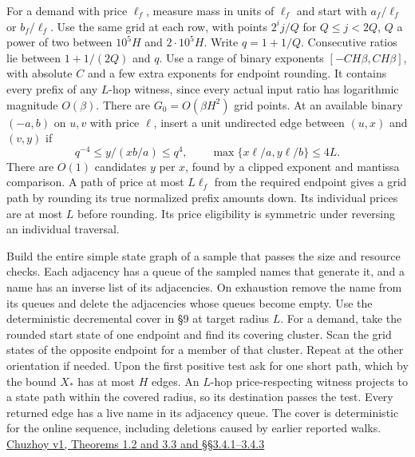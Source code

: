 \documentclass[11pt]{article}
\begin{document}
For a demand with price \(\ell_f\), measure mass in units of \(\ell_f\) and start with \(a_f/\ell_f\) or \(b_f/\ell_f\). Use the same grid at each row, with points \(2^i j/Q\) for \(Q\le j<2Q\), \(Q\) a power of two between \(10^5H\) and \(2\cdot10^5H\). Write \(q=1+1/Q\). Consecutive ratios lie between \(1+1/(2Q)\) and \(q\). Use a range of binary exponents \([-C H\beta,C H\beta]\), with absolute \(C\) and a few extra exponents for endpoint rounding. It contains every prefix of any \(L\)-hop witness, since every actual input ratio has logarithmic magnitude \(O(\beta)\). There are \(G_0=O(\beta H^2)\) grid points. At an available binary \((-a,b)\) on \(u,v\) with price \(\ell\), insert a unit undirected edge between \((u,x)\) and \((v,y)\) if
\[
 q^{-4}\le y/(xb/a)\le q^4,\qquad \max\{x\ell/a,y\ell/b\}\le4L .
\]
There are \(O(1)\) candidates \(y\) per \(x\), found by a clipped exponent and mantissa comparison. A path of price at most \(L\ell_f\) from the required endpoint gives a grid path by rounding its true normalized prefix amounts down. Its individual prices are at most \(L\) before rounding. Its price eligibility is symmetric under reversing an individual traversal.

Build the entire simple state graph of a sample that passes the size and resource checks. Each adjacency has a queue of the sampled names that generate it, and a name has an inverse list of its adjacencies. On exhaustion remove the name from its queues and delete the adjacencies whose queues become empty. Use the deterministic decremental cover in §9 at target radius \(L\). For a demand, take the rounded start state of one endpoint and find its covering cluster. Scan the grid states of the opposite endpoint for a member of that cluster. Repeat at the other orientation if needed. Upon the first positive test ask for one short path, which by the bound \(X_*\) has at most \(H\) edges. An \(L\)-hop price-respecting witness projects to a state path within the covered radius, so its destination passes the test. Every returned edge has a live name in its adjacency queue. The cover is deterministic for the online sequence, including deletions caused by earlier reported walks. \href{https://arxiv.org/pdf/2109.05621v1}{Chuzhoy v1, Theorems 1.2 and 3.3 and §§3.4.1--3.4.3}
\end{document}
